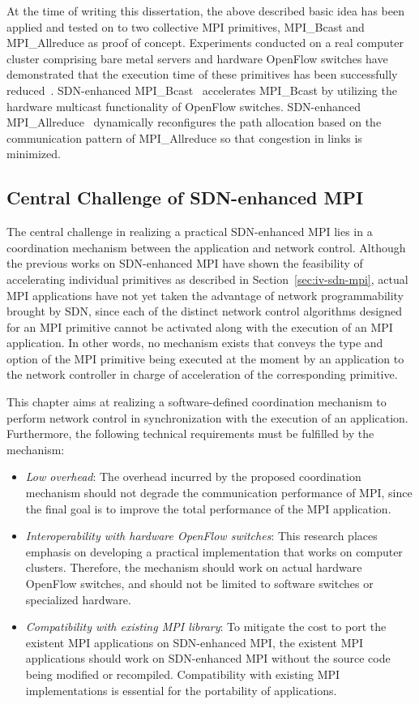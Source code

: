 At the time of writing this dissertation, the above described
basic idea has been applied and tested on to two collective MPI primitives,
MPI\_Bcast and MPI\_Allreduce as proof of concept. Experiments conducted on a
real computer cluster comprising bare metal servers and hardware OpenFlow
switches have demonstrated that the execution time of these primitives has
been successfully reduced~\autocite{Dashdavaa2013,Takahashi2014}. SDN-enhanced
MPI\_Bcast~\autocite{Dashdavaa2013} accelerates MPI\_Bcast by utilizing the
hardware multicast functionality of OpenFlow switches. SDN-enhanced
MPI\_Allreduce~\autocite{Takahashi2014} dynamically reconfigures the path
allocation based on the communication pattern of MPI\_Allreduce so that
congestion in links is minimized.

\subsection{Central Challenge of SDN-enhanced MPI}

The central challenge in realizing a practical SDN-enhanced MPI lies in
a coordination mechanism between the application and network control.
Although the previous works on SDN-enhanced MPI have shown the
feasibility of accelerating individual primitives as described in
Section~\ref{sec:iv-sdn-mpi}, actual MPI applications have not yet
taken the advantage of network programmability brought by SDN, since each of
the distinct network control algorithms designed for an MPI primitive
cannot be activated along with the execution of an MPI application. In
other words, no mechanism exists that conveys the type and option of the
MPI primitive being executed at the moment by an application to the
network controller in charge of acceleration of the corresponding
primitive.

This chapter aims at realizing a software-defined coordination mechanism to
perform network control in synchronization with the execution of an
application. Furthermore, the following technical requirements must be
fulfilled by the mechanism:

\begin{itemize}
\item
  \emph{Low overhead}: The overhead incurred by the proposed coordination
  mechanism should not degrade the communication performance of MPI, since the
  final goal is to improve the total performance of the MPI application.
\item
  \emph{Interoperability with hardware OpenFlow switches}: This research
  places emphasis on developing a practical implementation that works on
  computer clusters. Therefore, the mechanism should work on actual hardware
  OpenFlow switches, and should not be limited to software switches or
  specialized hardware.
\item
  \emph{Compatibility with existing MPI library}: To mitigate the
  cost to port the existent MPI applications on SDN-enhanced MPI, the existent
  MPI applications should work on SDN-enhanced MPI without the source code
  being modified or recompiled. Compatibility with existing MPI
   implementations is essential for the portability of applications.
\end{itemize}

